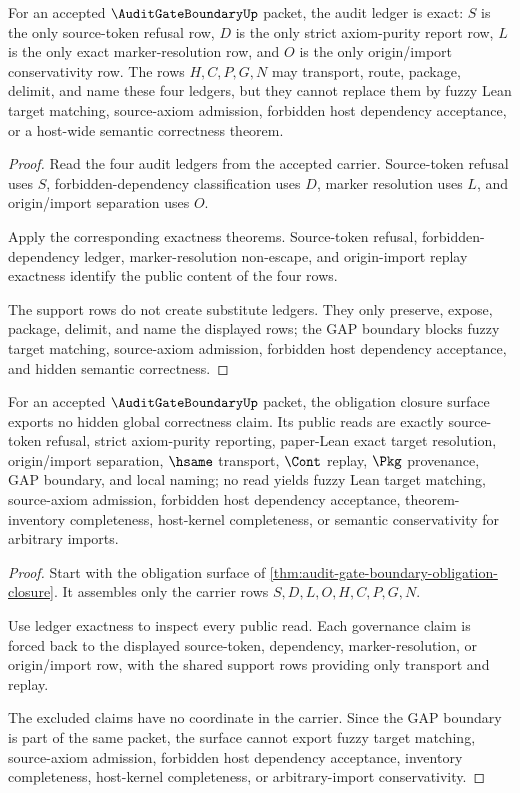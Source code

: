 \begin{theorem}
\label{thm:audit-gate-boundary-ledger-exactness}
For an accepted $\AuditGateBoundaryUp$ packet, the audit ledger is exact: $S$ is the only source-token refusal row, $D$ is the only strict axiom-purity report row, $L$ is the only exact marker-resolution row, and $O$ is the only origin/import conservativity row. The rows $H,C,P,G,N$ may transport, route, package, delimit, and name these four ledgers, but they cannot replace them by fuzzy Lean target matching, source-axiom admission, forbidden host dependency acceptance, or a host-wide semantic correctness theorem.
\end{theorem}
\begin{proof}
Read the four audit ledgers from the accepted carrier. Source-token refusal uses $S$, forbidden-dependency classification uses $D$, marker resolution uses $L$, and origin/import separation uses $O$.

Apply the corresponding exactness theorems. Source-token refusal, forbidden-dependency ledger, marker-resolution non-escape, and origin-import replay exactness identify the public content of the four rows.

The support rows do not create substitute ledgers. They only preserve, expose, package, delimit, and name the displayed rows; the GAP boundary blocks fuzzy target matching, source-axiom admission, forbidden host dependency acceptance, and hidden semantic correctness.
\end{proof}

\begin{theorem}
\label{thm:audit-gate-boundary-nonescape}
For an accepted $\AuditGateBoundaryUp$ packet, the obligation closure surface exports no hidden global correctness claim. Its public reads are exactly source-token refusal, strict axiom-purity reporting, paper-Lean exact target resolution, origin/import separation, $\hsame$ transport, $\Cont$ replay, $\Pkg$ provenance, GAP boundary, and local naming; no read yields fuzzy Lean target matching, source-axiom admission, forbidden host dependency acceptance, theorem-inventory completeness, host-kernel completeness, or semantic conservativity for arbitrary imports.
\end{theorem}
\begin{proof}
Start with the obligation surface of \autoref{thm:audit-gate-boundary-obligation-closure}. It assembles only the carrier rows $S,D,L,O,H,C,P,G,N$.

Use ledger exactness to inspect every public read. Each governance claim is forced back to the displayed source-token, dependency, marker-resolution, or origin/import row, with the shared support rows providing only transport and replay.

The excluded claims have no coordinate in the carrier. Since the GAP boundary is part of the same packet, the surface cannot export fuzzy target matching, source-axiom admission, forbidden host dependency acceptance, inventory completeness, host-kernel completeness, or arbitrary-import conservativity.
\end{proof}

